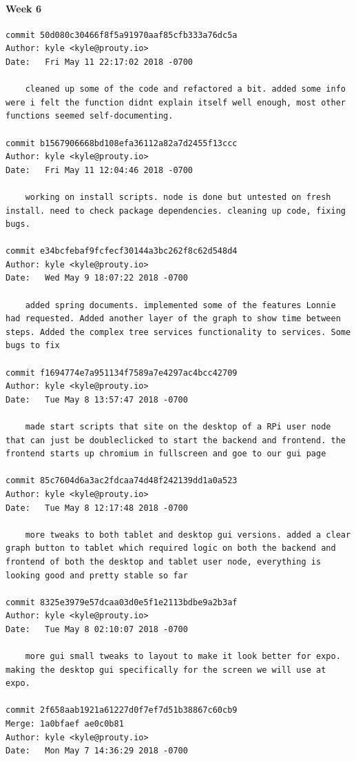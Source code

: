 \documentclass[draftclsnofoot, onecolumn, compsoc, 10pt]{IEEEtran}
\begin{document}
\paragraph{Week 6}
\begin{lstlisting}
commit 50d080c30466f8f5a91970aaf85cfb333a76dc5a 
Author: kyle <kyle@prouty.io> 
Date:   Fri May 11 22:17:02 2018 -0700 

    cleaned up some of the code and refactored a bit. added some info were i felt the function didnt explain itself well enough, most other functions seemed self-documenting. 

commit b1567906668bd108efa36112a82a7d2455f13ccc 
Author: kyle <kyle@prouty.io> 
Date:   Fri May 11 12:04:46 2018 -0700 

    working on install scripts. node is done but untested on fresh install. need to check package dependencies. cleaning up code, fixing bugs. 

commit e34bcfebaf9fcfecf30144a3bc262f8c62d548d4 
Author: kyle <kyle@prouty.io> 
Date:   Wed May 9 18:07:22 2018 -0700 

    added spring documents. implemented some of the features Lonnie had requested. Added another layer of the graph to show time between steps. Added the complex tree services functionality to services. Some bugs to fix 

commit f1694774e7a951134f7589a7e4297ac4bcc42709 
Author: kyle <kyle@prouty.io> 
Date:   Tue May 8 13:57:47 2018 -0700 

    made start scripts that site on the desktop of a RPi user node that can just be doubleclicked to start the backend and frontend. the frontend starts up chromium in fullscreen and goe to our gui page 

commit 85c7604d6a3ac2fdcaa74d48f242139dd1a0a523 
Author: kyle <kyle@prouty.io> 
Date:   Tue May 8 12:17:48 2018 -0700 

    more tweaks to both tablet and desktop gui versions. added a clear graph button to tablet which required logic on both the backend and frontend of both the desktop and tablet user node, everything is looking good and pretty stable so far 

commit 8325e3979e57dcaa03d0e5f1e2113bdbe9a2b3af 
Author: kyle <kyle@prouty.io> 
Date:   Tue May 8 02:10:07 2018 -0700 

    more gui small tweaks to layout to make it look better for expo. making the desktop gui specifically for the screen we will use at expo. 

commit 2f658aab1921a61227d0f7ef7d51b38867c60cb9 
Merge: 1a0bfaef ae0c0b81 
Author: kyle <kyle@prouty.io> 
Date:   Mon May 7 14:36:29 2018 -0700 


\end{lstlisting}
\end{document}
